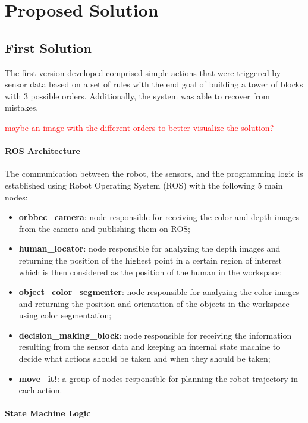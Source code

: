 \chapter{Proposed Solution}
\label{chapter:proposed_solution}

\section{First Solution}

The first version developed comprised simple actions that were triggered by sensor data based on a set of rules with the end goal of building a tower of blocks with 3 possible orders. Additionally, the system was able to recover from mistakes.

\textcolor{red}{maybe an image with the different orders to better visualize the solution?}

\subsubsection{ROS Architecture}

The communication between the robot, the sensors, and the programming logic is established using Robot Operating System (ROS) with the following 5 main nodes:

\begin{itemize}
    \item \textbf{orbbec\_camera}: node responsible for receiving the color and depth images from the camera and publishing them on ROS;
    \item \textbf{human\_locator}: node responsible for analyzing the depth images and returning the position of the highest point in a certain region of interest which is then considered as the position of the human in the workspace;
    \item \textbf{object\_color\_segmenter}: node responsible for analyzing the color images and returning the position and orientation of the objects in the workspace using color segmentation;
    \item \textbf{decision\_making\_block}: node responsible for receiving the information resulting from the sensor data and keeping an internal state machine to decide what actions should be taken and when they should be taken;
    \item \textbf{move\_it!}: a group of nodes responsible for planning the robot trajectory in each action.
\end{itemize}

\subsubsection{State Machine Logic}

